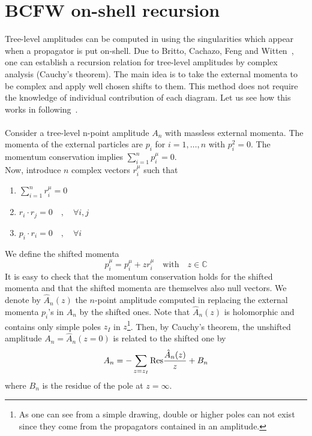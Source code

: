 \section{BCFW on-shell recursion}\label{sect-bcfw}
Tree-level amplitudes can be computed in using the singularities which appear when a propagator is put on-shell. 
Due to Britto, Cachazo, Feng and Witten~\cite{BRITTO2005499, PhysRevLett.94.181602}, one can establish a recursion relation for tree-level amplitudes by complex analysis (Cauchy's theorem).
The main idea is to take the external momenta to be complex and apply well chosen shifts to them.
This method does not require the knowledge of individual contribution of each diagram.
Let us see how this works in following~\cite{Elvang:2013cua}.
\\\\
Consider a tree-level n-point amplitude $A_n$ with massless external momenta.
The momenta of the external particles are $p_i$ for $i=1, \ldots, n$ with $p^2_i = 0$. 
The momentum conservation implies $\sum_{i=1}^n p_i^\mu = 0$. 
\\
Now, introduce $n$ complex vectors $r^{\mu}_i$ such that
\begin{enumerate}
\item $\sum_{i=1}^n r_i^{\mu}  = 0$
\item $r_i\cdot r_j = 0 \quad,\quad\forall i,j$
\item $p_i \cdot r_i = 0 \quad,\quad \forall i$
\end{enumerate}
We define the shifted momenta
\begin{equation*}
\hat{p}^\mu_i = p_i^{\mu} + z r_i^{\mu} \quad\textrm{with}\quad z\in\mathbb{C}
\end{equation*} 
It is easy to check that the momentum conservation holds for the shifted momenta and that the shifted momenta are themselves also null vectors.
We denote by $\hat{A}_n(z)$ the $n$-point amplitude computed in replacing the external momenta $p_i$'s in $A_n$ by the shifted ones. 
Note that $\hat{A}_n(z)$ is holomorphic and contains only simple poles $z_I$ in $z$\footnote{As one can see from a simple drawing, double or higher poles can not exist since they come from the propagators contained in an amplitude.}.
Then, by Cauchy's theorem, the unshifted amplitude $A_n = \hat{A}_n(z=0)$ is related to the shifted one by
\begin{equation}\label{residue}
A_n = - \sum_{z = z_I}\mathrm{Res}\frac{\hat{A}_n(z)}{z} + B_n
\end{equation} 
where $B_n$ is the residue of the pole at $z = \infty$.
